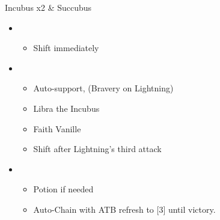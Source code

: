 	\begin{battle}[0:28]{Incubus x2 \& Succubus}
		\begin{itemize}
			\item \fourth
			      \begin{itemize}
				      \item Shift immediately
			      \end{itemize}
			\item \second
			      \begin{itemize}
				      \item Auto-support, (Bravery on Lightning)
				      \item Libra the Incubus
				      \item Faith Vanille
				      \item Shift after Lightning's third attack
			      \end{itemize}
			\item \first
			      \begin{itemize}
				      \item Potion if needed
				      \item Auto-Chain with ATB refresh to [3] until victory.
			      \end{itemize}
		\end{itemize}
		 
	\end{battle}
\vfill
\renewcommand{\first}{[1] Relentless Assault (\rav/\com/\rav)}
\renewcommand{\second}{[2] Bully (\syn/\com/\sab)}
\renewcommand{\third}{[3] Relentless Assault (\rav/\com/\rav)}
\renewcommand{\fourth}{[4] Smart Bomb (\rav/\rav/\sab)}
\renewcommand{\fifth}{[5] Tri-Disaster (\rav/\rav/\rav)}
\renewcommand{\sixth}{[6] Malevolence (\syn/\rav/\rav)}

